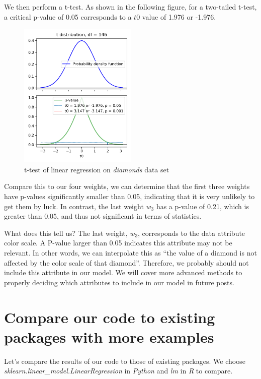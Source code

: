 \documentclass[
	letterpaper
]{article}
\begin{document}
We then perform a t-test.
As shown in the following figure, for a two-tailed t-test, a critical p-value of 0.05 corresponds to a $t0$ value of 1.976 or -1.976.
\begin{figure}[htbp]
	\centering
	\includegraphics[width=0.5\textwidth]{figures/t-test.png}
	\caption{t-test of linear regression on \textit{diamonds} data set}
	\label{fig:t-test}
\end{figure}

Compare this to our four weights, we can determine that the first three weights have p-values significantly smaller than 0.05, indicating that it is very unlikely to get them by luck.
In contrast, the last weight $w_3$ has a p-value of 0.21, which is greater than 0.05, and thus not significant in terms of statistics.

What does this tell us?
The last weight, $w_3$, corresponds to the data attribute color scale. 
A P-value larger than 0.05 indicates this attribute may not be relevant. 
In other words, we can interpolate this as ``the value of a diamond is not affected by the color scale of that diamond''.
Therefore, we probably should not include this attribute in our model.
We will cover more advanced methods to properly deciding which attributes to include in our model in future posts. 

\section{Compare our code to existing packages with more examples}
Let's compare the results of our code to those of existing packages.
We choose \textit{sklearn.linear\_model.LinearRegression} in \textit{Python} and \textit{lm} in \textit{R} to compare.
\end{document}

